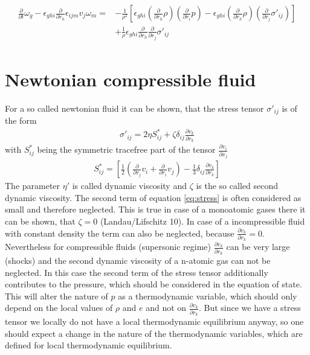 \documentclass[a4paper,
					12pt,
					twoside,
					pagesize,
					cleardoubleplain,
					headsepline,
					bibtotoc
					]{scrbook}
\newcommand{\lra}[1]{{ \left( #1 \right) }}
\newcommand{\lrb}[1]{{ \left[ #1 \right] }}
\newcommand{\pd}[1]{\frac{\partial}{\partial #1}}
\newcommand{\ppd}[2]{\frac{\partial #2}{\partial #1}}
\begin{document}
\begin{align}
\begin{split}
\pd{t}\omega_g
-\epsilon_{ghi}\pd{r_h} \epsilon_{ijm} v_j \omega_m =
&-\frac{1}{\rho^2}\lrb{
\epsilon_{ghi} \lra{\pd{r_h}\rho} \lra{\pd{r_i}p}
-\epsilon_{ghi} \lra{\pd{r_h}\rho} \lra{\pd{r_j}\sigma'_{ij}}}\\
&+\frac{1}{\rho}\epsilon_{ghi}\pd{r_h}\pd{r_j}\sigma'_{ij}
\end{split}
\label{eq:vort}
\end{align}

\chapter{Newtonian compressible fluid}
For a so called newtonian fluid it can be shown, that the stress tensor
$\sigma'_{ij}$ is of the form
\begin{align}
\sigma'_{ij}=2\eta S^*_{ij}+\zeta \delta_{ij}\ppd{r_k}{v_k}
\label{eq:stress}
\end{align}
with $S^*_{ij}$ being the symmetric tracefree part of the tensor
$\ppd{x_j}{v_i}$
\begin{align}
S^*_{ij}=\lrb{\frac{1}{2}\lra{\pd{r_j}v_i+\pd{r_i}v_j}-\frac{1}{3}\delta_{ij}
\ppd{r_k}{v_k}}
\end{align}
The parameter $\eta'$ is called dynamic viscosity and $\zeta$ is the so called
second dynamic viscosity. The second term of equation \eqref{eq:stress} is
often considered as small and therefore neglected. This is true in case of a
monoatomic gases there it can be shown, that $\zeta=0$ (Landau/Lifschitz 10).
In case of a incompressible fluid with constant density the term can also be
neglected, because $\ppd{r_k}{v_k} = 0$. Nevertheless for compressible fluids
(supersonic regime) $\ppd{r_k}{v_k}$ can be very large (shocks) and the second
dynamic viscosity of a n-atomic gas can not be neglected. In this case the
second term of the stress tensor additionally contributes to the pressure,
which should be considered in the equation of state. This will alter the nature
of $p$ as a thermodynamic variable, which should only depend on the local values
of $\rho$ and $e$ and not on $\ppd{r_k}{v_k}$. But since we have a stress tensor
we locally do not have a local thermodynamic equilibrium anyway, so one should
expect a change in the nature of the thermodynamic variables, which are
defined for local thermodynamic equilibrium.
\end{document}
